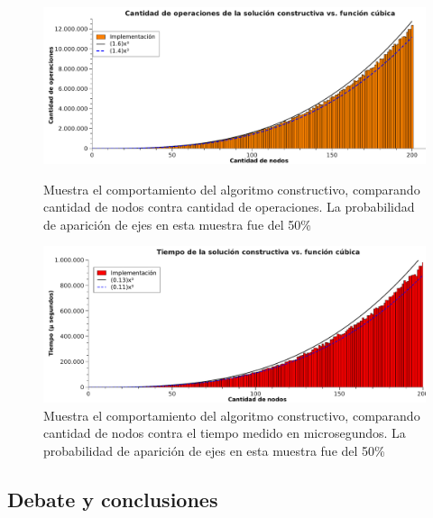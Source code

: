 \begin{figure}[htb]
    \begin{minipage}{\textwidth}
	\begin{center}
		\includegraphics[width=\textwidth]{./otros/graficos/operaciones_200nodos1_ej3.pdf}
		\caption{Muestra el comportamiento del algoritmo constructivo, comparando cantidad de nodos contra cantidad de operaciones. La probabilidad de aparición de ejes en esta muestra fue del 50\%}
		\label{ej3contarOp}
	\end{center}
    \end{minipage}

\vspace*{3cm}

    \begin{minipage}{\textwidth}
	\begin{center}
		\includegraphics[width=\textwidth]{./otros/graficos/tiempo_200nodos1_ej3.pdf}
		\caption{Muestra el comportamiento del algoritmo constructivo, comparando cantidad de nodos contra el tiempo medido en microsegundos. La probabilidad de aparición de ejes en esta muestra fue del 50\%}
		\label{ej3contarTiempo2}
	\end{center}
    \end{minipage}

\end{figure}


\subsection{Debate y conclusiones}
